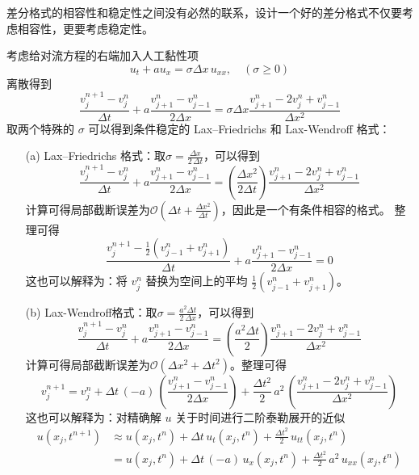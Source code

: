 \begin{remark}
    差分格式的相容性和稳定性之间没有必然的联系，设计一个好的差分格式不仅要考虑相容性，更要考虑稳定性。
\end{remark}

考虑给对流方程的右端加入人工黏性项
\[
    u_t + a u_x =  \sigma \Delta x\, u_{xx},\quad (\sigma \ge 0)
\]
离散得到
\[
    \frac{v_j^{n+1}-v_j^n}{\Delta t} + a \frac{v_{j+1}^n-v_{j-1}^n}{2\Delta x} = \sigma \Delta x \frac{v_{j+1}^n-2 v_j^n+v_{j-1}^n}{\Delta x^2}
\]
取两个特殊的 $\sigma$ 可以得到条件稳定的 Lax–Friedrichs 和 Lax-Wendroff 格式：

\begin{itemize}
    \item[(a)] Lax–Friedrichs 格式：取$\sigma = \frac{\Delta x}{2\,\Delta t}$，可以得到
          \[
              \frac{v_j^{n+1}-v_j^n}{\Delta t} + a \frac{v_{j+1}^n-v_{j-1}^n}{2\Delta x} = \left(\frac{\Delta x^2}{2\Delta t}\right) \frac{v_{j+1}^n-2 v_j^n+v_{j-1}^n}{\Delta x^2}
          \]
          计算可得局部截断误差为$\mathcal{O}(\Delta t + \frac{\Delta x^2}{\Delta t})$，因此是一个有条件相容的格式。
          整理可得
          \[
              \frac{v_j^{n+1}-\frac12(v_{j-1}^n+v_{j+1}^n)}{\Delta t} + a \frac{v_{j+1}^n-v_{j-1}^n}{2\Delta x} = 0
          \]
          这也可以解释为：将 $v_j^n$ 替换为空间上的平均 $\frac12(v_{j-1}^{n} + v_{j+1}^{n})$。

    \item[(b)] Lax-Wendroff格式：取$\sigma = \frac{a^2 \Delta t}{2\,\Delta x}$，可以得到
          \[
              \frac{v_j^{n+1}-v_j^n}{\Delta t} + a \frac{v_{j+1}^n-v_{j-1}^n}{2\Delta x} = \left(\frac{a^2 \Delta t}{2}\right) \frac{v_{j+1}^n-2 v_j^n+v_{j-1}^n}{\Delta x^2}
          \]
          计算可得局部截断误差为$\mathcal{O}(\Delta x^2+\Delta t^2)$。整理可得
          \[
              v_{j}^{n+1} = v_j^n + \Delta t \,(-a)\,\left(\frac{v_{j+1}^n- v_{j-1}^n}{2\Delta x}\right)
              + \frac{\Delta t^2}2\,a^2\,\left(\frac{v_{j+1}^n-2v_{j}^n+v_{j-1}^n}{\Delta x^2}\right)
          \]
          这也可以解释为：对精确解 $u$ 关于时间进行二阶泰勒展开的近似
          \begin{align*}
              u(x_j,t^{n+1})
               & \approx u(x_j,t^n) + \Delta t \,u_t(x_j,t^n) + \frac{\Delta t^2}2\,u_{tt}(x_j,t^n)      \\
               & = u(x_j,t^n) + \Delta t \,(-a)\,u_x(x_j,t^n) + \frac{\Delta t^2}2\,a^2\,u_{xx}(x_j,t^n)
          \end{align*}
\end{itemize}

